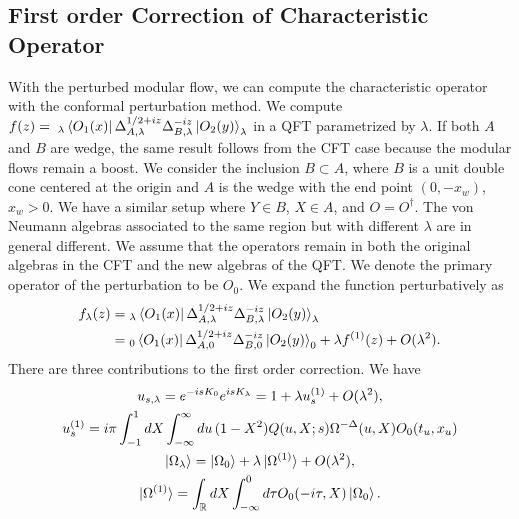 \documentclass[a4paper,11pt]{article}
\theoremstyle{definition}
\newcommand{\KL}[1]{\textcolor{brown}{#1}}
\begin{document}





\subsection{First order Correction of Characteristic Operator}
With the perturbed modular flow, we can compute the characteristic operator with the conformal perturbation method. We compute $f(z)= \;_\lambda\bra{O_1(x)}\Delta_{A,\lambda}^{1/2+iz}\Delta_{B,\lambda}^{-iz}\ket{O_2(y)}_\lambda$ in a QFT parametrized by $\lambda$. If both $A$ and $B$ are wedge, the same result follows from the CFT case because the modular flows remain a boost. We consider the inclusion $B\subset A$, where $B$ is a unit double cone centered at the origin and $A$ is the wedge with the end point $(0,-x_w)$, $x_w >0$. We have a similar setup where $Y\in B$, $X\in A$, and $O=O^\dagger$. The von Neumann algebras associated to the same region but with different $\lambda$ are in general different. We assume that the operators remain in both the original algebras in the CFT and the new algebras of the QFT. We denote the primary operator of the perturbation to be $O_0$. We expand the function perturbatively as
\begin{align}
    f_\lambda(z) =&\;_\lambda\bra{O_1(x)}\Delta_{A,\lambda}^{1/2+iz}\Delta_{B,\lambda}^{-iz}\ket{O_2(y)}_\lambda \\
    =&\; _0\bra{O_1(x)}\Delta_{A,0}^{1/2+iz}\Delta_{B,0}^{-iz}\ket{O_2(y)}_0 + \lambda f^{(1)}(z) + O(\lambda^2).
\end{align}
There are three contributions to the first order correction. We have
\begin{gather}
    u_{s,\lambda} = e^{-isK_0}e^{isK_\lambda} = 1 + \lambda u_{s}^{(1)} +O(\lambda^2),\\
    u_{s}^{(1)} = i\pi  \int_{-1}^1 dX \int_{-\infty}^{\infty} du \, (1-X^2) Q(u,X;s) \Omega^{-\Delta}(u,X) O_0(t_u,x_u)\\
    \ket{\Omega_\lambda} = \ket{\Omega_0} + \lambda\ket{\Omega^{(1)}} + O(\lambda^2),\\
    \ket{\Omega^{(1)}} = \int_\mathbb{R} dX \int_{-\infty}^{0} d\tau O_0(-i\tau,X) \ket{\Omega_0}.
\end{gather}
\end{document}
